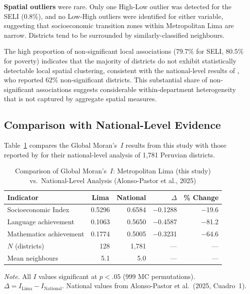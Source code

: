 \documentclass[12pt,a4paper,twoside]{article}
\begin{document}
\textbf{Spatial outliers} were rare. Only one High-Low outlier was detected for the
SELI (0.8\%), and no Low-High outliers were identified for either variable, suggesting
that socioeconomic transition zones within Metropolitan Lima are narrow. Districts tend
to be surrounded by similarly-classified neighbours.

The high proportion of non-significant local associations (79.7\% for SELI,
80.5\% for poverty) indicates that the majority of districts do not exhibit
statistically detectable local spatial clustering, consistent with the
national-level results of \citet{alonso2025segregacion}, who reported 62\%
non-significant districts. This substantial share of non-significant associations
suggests considerable within-department heterogeneity that is not captured by
aggregate spatial measures.

\subsection{Comparison with National-Level Evidence}

Table~\ref{tab:comparison} compares the Global Moran's~$I$ results from this study
with those reported by \citet{alonso2025segregacion} for their national-level
analysis of 1,781 Peruvian districts.

\begin{table}[htbp]
  \centering
  \footnotesize
  \caption{Comparison of Global Moran's~$I$: Metropolitan Lima (this study)
           vs.\ National-Level Analysis (Alonso-Pastor et al., 2025)}
  \label{tab:comparison}
  \begin{tabular}{lrrrr}
    \toprule
    Indicator & \multicolumn{1}{c}{Lima} & \multicolumn{1}{c}{National} & $\Delta$ & \% Change \\
    \midrule
    Socioeconomic Index  & 0.5296 & 0.6584 & $-$0.1288 & $-$19.6 \\
    Language achievement  & 0.1063 & 0.5650 & $-$0.4587 & $-$81.2 \\
    Mathematics achievement & 0.1774 & 0.5005 & $-$0.3231 & $-$64.6 \\
    \midrule
    $N$ (districts) & 128 & 1,781 & --- & --- \\
    Mean neighbours & 5.1 & 5.0 & --- & --- \\
    \bottomrule
  \end{tabular}

  \vspace{4pt}
  \begin{minipage}{0.92\textwidth}
  \footnotesize\textit{Note.} All $I$ values significant at $p < .05$
  (999 MC permutations). $\Delta = I_{\text{Lima}} - I_{\text{National}}$.
  National values from Alonso-Pastor et al.\ (2025, Cuadro~1).
  \end{minipage}
\end{table}
\end{document}
